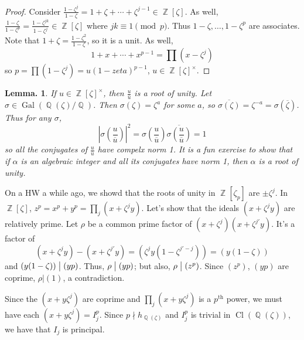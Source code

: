 \documentclass[11pt, a4paper]{memoir}
\DeclareMathOperator{\Q}{{\mathbb{Q}}}
\DeclareMathOperator{\Z}{{\mathbb{Z}}}
\renewcommand{\div}{\bigm|}
\newcommand{\ol}[1]{\ensuremath{\overline{#1}}}
\theoremstyle{change}
\newtheorem{lemma}[theorem]{Lemma.}
\theoremstyle{plain}
\theoremstyle{nonumberplain}
\newtheorem{proof}{Proof}
\DeclareMathOperator{\Gal}{Gal}
\DeclareMathOperator{\Cl}{Cl}
\numberwithin{equation}{section}
\begin{document}
\begin{proof}
    Consider $\frac{1-\zeta^j}{1-\zeta}=1+\zeta+\cdots+\zeta^{j-1}\in\Z[\zeta]$.
    As well, $\frac{1-\zeta}{1-\zeta^p}=\frac{1-\zeta^{jk}}{1-\zeta^j}\in\Z[\zeta]$ where $jk\equiv 1\pmod{p}$.
    Thus $1-\zeta,\ldots,1-\zeta^p$ are associates.
    Note that $1+\zeta=\frac{1-\zeta^2}{1-\zeta}$, so it is a unit.
    As well,
    \begin{equation*}
        1+x+\cdots+x^{p-1}=\prod(x-\zeta^j)
    \end{equation*}
    so $p=\prod(1-\zeta^j)=u(1-zeta)^{p-1}$, $u\in\Z[\zeta]^\times$.
\end{proof}
\begin{lemma}
    If $u\in\Z[\zeta]^\times$, then $\frac{u}{\ol{u}}$ is a root of unity.
    Let $\sigma\in\Gal(\Q(\zeta)/\Q)$.
    Then $\sigma(\zeta)=\zeta^a$ for some $a$, so $\ol{\sigma(\zeta)}=\zeta^{-a}=\sigma(\ol{\zeta})$.
    Thus for any $\sigma$,
    \begin{equation*}
        \left\lvert\sigma\left(\frac{u}{\ol{u}}\right)\right\rvert^2=\sigma\left(\frac{u}{\ol{u}}\right)\ol{\sigma\left(\frac{u}{\ol{u}}\right)}=1
    \end{equation*}
    so all the conjugates of $\frac{u}{\ol{u}}$ have compelx norm 1.
    It is a fun exercise to show that if $\alpha$ is an algebraic integer and all its conjugates have norm 1, then $\alpha$ is a root of unity.
\end{lemma}
On a HW a while ago, we showd that the roots of unity in $\Z[\zeta_p]$ are $\pm\zeta^j$.
In $\Z[\zeta]$, $z^p=x^p+y^p=\prod_j(x+\zeta^jy)$.
Let's show that the ideals $(x+\zeta^jy)$ are relatively prime.
Let $\rho$ be a common prime factor of $(x+\zeta^j)(x+\zeta^{j'}y)$.
It's a factor of
\begin{equation*}
    (x+\zeta^jy)-(x+\zeta^{j'}y)=\left(\zeta^jy(1-\zeta^{j'-j})\right)=(y(1-\zeta))
\end{equation*}
and $(y(1-\zeta))\div(yp)$.
Thus, $\rho\div(yp)$; but also, $\rho\div(z^p)$.
Since $(z^p)$, $(yp)$ are coprime, $\rho|(1)$, a contradiction.

Since the $(x+y\zeta^j)$ are coprime and $\prod_j(x+y\zeta^j)$ is a $p^\text{th}$ power, we must have each $(x+y\zeta^j)=I_j^p$.
Since $p\nmid h_{\Q(\zeta)}$ and $I_j^p$ is trivial in $\Cl(\Q(\zeta))$, we have that $I_j$ is principal.
\end{document}
